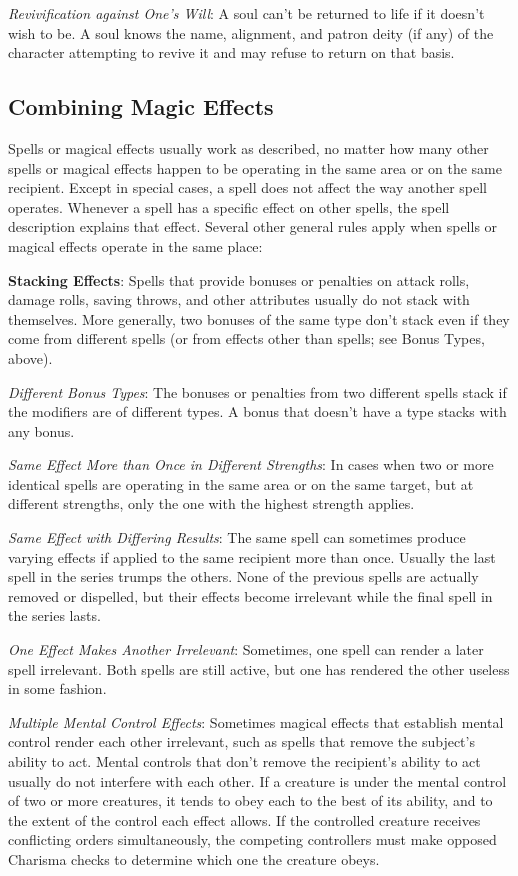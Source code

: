\textit{Revivification against One's Will}: A soul can't be returned to life if it doesn't wish to be. A soul knows the name, alignment, and patron deity (if any) of the character attempting to revive it and may refuse to return on that basis.
				
\subsection{Combining Magic Effects}

				
Spells or magical effects usually work as described, no matter how many other spells or magical effects happen to be operating in the same area or on the same recipient. Except in special cases, a spell does not affect the way another spell operates. Whenever a spell has a specific effect on other spells, the spell description explains that effect. Several other general rules apply when spells or magical effects operate in the same place:
				
\textbf{Stacking Effects}: Spells that provide bonuses or penalties on attack rolls, damage rolls, saving throws, and other attributes usually do not stack with themselves. More generally, two bonuses of the same type don't stack even if they come from different spells (or from effects other than spells; see Bonus Types, above). 
				
\textit{Different Bonus Types}: The bonuses or penalties from two different spells stack if the modifiers are of different types. A bonus that doesn't have a type stacks with any bonus.
				
\textit{Same Effect More than Once in Different Strengths}: In cases when two or more identical spells are operating in the same area or on the same target, but at different strengths, only the one with the highest strength applies.
				
\textit{Same Effect with Differing Results}: The same spell can sometimes produce varying effects if applied to the same recipient more than once. Usually the last spell in the series trumps the others. None of the previous spells are actually removed or dispelled, but their effects become irrelevant while the final spell in the series lasts.
				
\textit{One Effect Makes Another Irrelevant}: Sometimes, one spell can render a later spell irrelevant. Both spells are still active, but one has rendered the other useless in some fashion.
				
\textit{Multiple Mental Control Effects}: Sometimes magical effects that establish mental control render each other irrelevant, such as spells that remove the subject's ability to act. Mental controls that don't remove the recipient's ability to act usually do not interfere with each other. If a creature is under the mental control of two or more creatures, it tends to obey each to the best of its ability, and to the extent of the control each effect allows. If the controlled creature receives conflicting orders simultaneously, the competing controllers must make opposed Charisma checks to determine which one the creature obeys.
				
